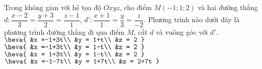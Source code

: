 \begin{ex}%
	Trong không gian với hệ tọa độ $Oxyz$, cho điểm $M\left(-1;1;2\right)$ và hai đường thẳng $d\colon \dfrac{x-2}{3} = \dfrac{y+3}{2} = \dfrac{z-1}{1}$, $d'\colon \dfrac{x+1}{1} = \dfrac{y}{3} = \dfrac{z}{-2}$. Phương trình nào dưới đây là phương trình đường thẳng đi qua điểm $M$, cắt $d$ và vuông góc với $d'$.
	\choice
	{$\heva{
			&x =-1+3t\\
			&y = 1+t\\
			&z = 2
		}$}
	{\True$\heva{
			&x =-1+3t\\
			&y = 1-t\\
			&z = 2
		}$}
	{$ \heva{
			&x = 1+3t\\
			&y = 1-t\\
			&z = 2
		}$}
	{$  \heva{
			&x =-1-7t\\
			&y = 1+7t\\
			&z = 2+7t
		}$}
\end{ex}


